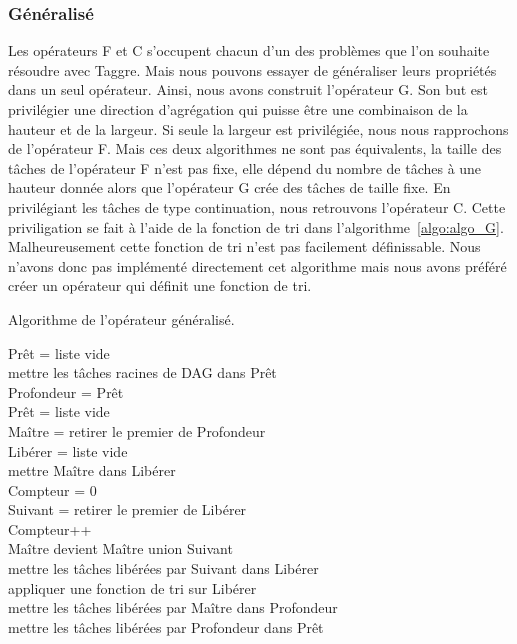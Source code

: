 \subsubsection{Généralisé}
Les opérateurs F et C s'occupent chacun d'un des problèmes que l'on souhaite résoudre avec Taggre.
%
Mais nous pouvons essayer de généraliser leurs propriétés dans un seul opérateur.
%
Ainsi, nous avons construit l'opérateur G.
%
Son but est privilégier une direction d'agrégation qui puisse être une combinaison de la hauteur et de la largeur.
%
Si seule la largeur est privilégiée, nous nous rapprochons de l'opérateur F.
%
Mais ces deux algorithmes ne sont pas équivalents, la taille des tâches de l'opérateur F n'est pas fixe, elle dépend du nombre de tâches à une hauteur donnée alors que l'opérateur G crée des tâches de taille fixe.
%
En privilégiant les tâches de type continuation, nous retrouvons l'opérateur C.
%
Cette priviligation se fait à l'aide de la fonction de tri dans l'algorithme~\ref{algo:algo_G}.
%
Malheureusement cette fonction de tri n'est pas facilement définissable.
%
Nous n'avons donc pas implémenté directement cet algorithme mais nous avons préféré créer un opérateur qui définit une fonction de tri.


\begin{algorithm}
  \caption{Algorithme de l'opérateur généralisé.}
  \label{algo:algo_G}
  {\sc Prêt} = liste vide \\
  mettre les tâches racines de DAG dans {\sc Prêt} \\
   {
    {\sc Profondeur} = {\sc Prêt} \\
    {\sc Prêt} = liste vide \\
     {
      {\sc Maître} = retirer le premier de {\sc Profondeur} \\
      {\sc Libérer} = liste vide \\
      mettre {\sc Maître} dans {\sc Libérer} \\
      {\sc Compteur} = 0 \\
       {
        {\sc Suivant} = retirer le premier de {\sc Libérer} \\
        {\sc Compteur}++\\
        {\sc Maître} devient {\sc Maître} union {\sc Suivant}\\
        mettre les tâches libérées par {\sc Suivant} dans {\sc Libérer} \\
        appliquer une fonction de tri sur {\sc Libérer} \\
      }
      mettre les tâches libérées par {\sc Maître} dans {\sc Profondeur} \\
    }
    mettre les tâches libérées par {\sc Profondeur} dans {\sc Prêt}\\
  }
\end{algorithm}
